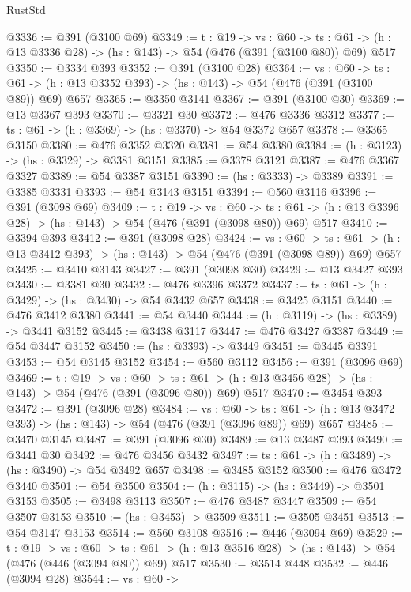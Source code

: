 \begin{lexlean}{RustStd}
\begin{coremodule}
@3336 := @391 (@3100 @69)
@3349 := {t : @19} ->
  {vs : @60} ->
  {ts : @61} -> (h : @13 @3336 @28) -> (hs : @143) -> @54 (@476 (@391 (@3100 @80)) @69) @517
@3350 := @3334 @393
@3352 := @391 (@3100 @28)
@3364 := {vs : @60} ->
  {ts : @61} -> (h : @13 @3352 @393) -> (hs : @143) -> @54 (@476 (@391 (@3100 @89)) @69) @657
@3365 := @3350 @3141
@3367 := @391 (@3100 @30)
@3369 := @13 @3367 @393
@3370 := @3321 @30
@3372 := @476 @3336 @3312
@3377 := {ts : @61} -> (h : @3369) -> (hs : @3370) -> @54 @3372 @657
@3378 := @3365 @3150
@3380 := @476 @3352 @3320
@3381 := @54 @3380
@3384 := (h : @3123) -> (hs : @3329) -> @3381 @3151
@3385 := @3378 @3121
@3387 := @476 @3367 @3327
@3389 := @54 @3387 @3151
@3390 := (hs : @3333) -> @3389
@3391 := @3385 @3331
@3393 := @54 @3143 @3151
@3394 := @560 @3116
@3396 := @391 (@3098 @69)
@3409 := {t : @19} ->
  {vs : @60} ->
  {ts : @61} -> (h : @13 @3396 @28) -> (hs : @143) -> @54 (@476 (@391 (@3098 @80)) @69) @517
@3410 := @3394 @393
@3412 := @391 (@3098 @28)
@3424 := {vs : @60} ->
  {ts : @61} -> (h : @13 @3412 @393) -> (hs : @143) -> @54 (@476 (@391 (@3098 @89)) @69) @657
@3425 := @3410 @3143
@3427 := @391 (@3098 @30)
@3429 := @13 @3427 @393
@3430 := @3381 @30
@3432 := @476 @3396 @3372
@3437 := {ts : @61} -> (h : @3429) -> (hs : @3430) -> @54 @3432 @657
@3438 := @3425 @3151
@3440 := @476 @3412 @3380
@3441 := @54 @3440
@3444 := (h : @3119) -> (hs : @3389) -> @3441 @3152
@3445 := @3438 @3117
@3447 := @476 @3427 @3387
@3449 := @54 @3447 @3152
@3450 := (hs : @3393) -> @3449
@3451 := @3445 @3391
@3453 := @54 @3145 @3152
@3454 := @560 @3112
@3456 := @391 (@3096 @69)
@3469 := {t : @19} ->
  {vs : @60} ->
  {ts : @61} -> (h : @13 @3456 @28) -> (hs : @143) -> @54 (@476 (@391 (@3096 @80)) @69) @517
@3470 := @3454 @393
@3472 := @391 (@3096 @28)
@3484 := {vs : @60} ->
  {ts : @61} -> (h : @13 @3472 @393) -> (hs : @143) -> @54 (@476 (@391 (@3096 @89)) @69) @657
@3485 := @3470 @3145
@3487 := @391 (@3096 @30)
@3489 := @13 @3487 @393
@3490 := @3441 @30
@3492 := @476 @3456 @3432
@3497 := {ts : @61} -> (h : @3489) -> (hs : @3490) -> @54 @3492 @657
@3498 := @3485 @3152
@3500 := @476 @3472 @3440
@3501 := @54 @3500
@3504 := (h : @3115) -> (hs : @3449) -> @3501 @3153
@3505 := @3498 @3113
@3507 := @476 @3487 @3447
@3509 := @54 @3507 @3153
@3510 := (hs : @3453) -> @3509
@3511 := @3505 @3451
@3513 := @54 @3147 @3153
@3514 := @560 @3108
@3516 := @446 (@3094 @69)
@3529 := {t : @19} ->
  {vs : @60} ->
  {ts : @61} -> (h : @13 @3516 @28) -> (hs : @143) -> @54 (@476 (@446 (@3094 @80)) @69) @517
@3530 := @3514 @448
@3532 := @446 (@3094 @28)
@3544 := {vs : @60} ->

\end{coremodule}
\end{lexlean}
